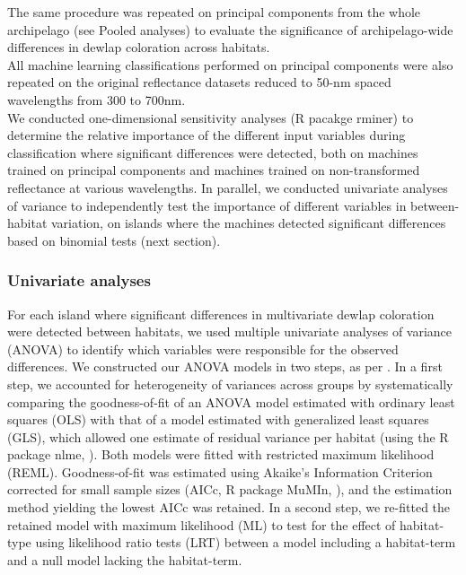 The same procedure was repeated on principal components from the whole archipelago (see Pooled analyses) to evaluate the significance of archipelago-wide differences in dewlap coloration across habitats.\\ 

All machine learning classifications performed on principal components were also repeated on the original reflectance datasets reduced to 50-nm spaced wavelengths from 300 to 700nm.\\

We conducted one-dimensional sensitivity analyses (R pacakge rminer) to determine the relative importance of the different input variables during classification where significant differences were detected, both on machines trained on principal components and machines trained on non-transformed reflectance at various wavelengths. In parallel, we conducted univariate analyses of variance to independently test the importance of different variables in between-habitat variation, on islands where the machines detected significant differences based on binomial tests (next section).

\subsubsection*{Univariate analyses}

For each island where significant differences in multivariate dewlap coloration were detected between habitats, we used multiple univariate analyses of variance (ANOVA) to identify which variables were responsible for the observed differences. We constructed our ANOVA models in two steps, as per \citet{Zuur2009}. In a first step, we accounted for heterogeneity of variances across groups by systematically comparing the goodness-of-fit of an ANOVA model estimated with ordinary least squares (OLS) with that of a model estimated with generalized least squares (GLS), which allowed one estimate of residual variance per habitat (using the R package nlme, \citealt{Pinheiro2000, Pinheiro2020}). Both models were fitted with restricted maximum likelihood (REML). Goodness-of-fit was estimated using Akaike's Information Criterion corrected for small sample sizes (AICc, R package MuMIn, \citealt{Barton2019}), and the estimation method yielding the lowest AICc was retained. In a second step, we re-fitted the retained model with maximum likelihood (ML) to test for the effect of habitat-type using likelihood ratio tests (LRT) between a model including a habitat-term and a null model lacking the habitat-term.\\

